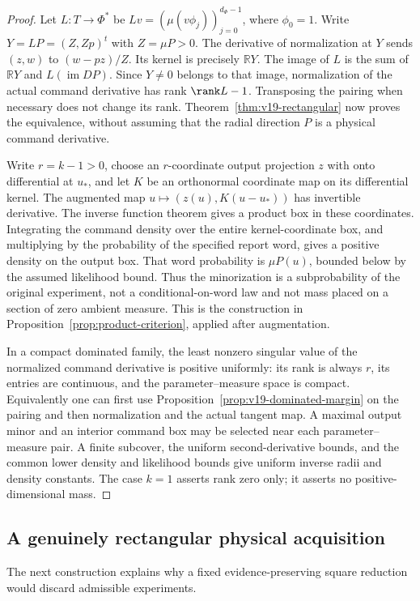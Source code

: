 \documentclass[11pt]{amsart}
\theoremstyle{definition}\newtheorem{definition}[theorem]{Definition}
\theoremstyle{remark}\newtheorem{remark}[theorem]{Remark}
\newcommand{\R}{\mathbb R}\newcommand{\N}{\mathbb N}\newcommand{\C}{\mathbb C}
\begin{document}
\begin{proof}
Let $L:T\to\Phi^*$ be $Lv=(\mu(v\phi_j))_{j=0}^{d_\Phi-1}$,
where $\phi_0=1$. Write $Y=LP=(Z,Zp)^t$ with $Z=\mu P>0$.
The derivative of normalization at $Y$ sends
$(z,w)$ to $(w-pz)/Z$. Its kernel is precisely $\R Y$.
The image of $L$ is the sum of $\R Y$ and $L(\operatorname{im}DP)$.
Since $Y\ne0$ belongs to that image, normalization of the actual
command derivative has rank $\rank L-1$. Transposing the pairing
when necessary does not change its rank. Theorem~\ref{thm:v19-rectangular}
now proves the equivalence, without assuming that the radial direction
$P$ is a physical command derivative.

Write $r=k-1>0$, choose an $r$-coordinate output projection $z$ with
onto differential at $u_*$, and let $K$ be an orthonormal coordinate
map on its differential kernel. The augmented map
$u\mapsto(z(u),K(u-u_*))$ has invertible derivative. The inverse
function theorem gives a product box in these coordinates. Integrating
the command density over the entire kernel-coordinate box, and
multiplying by the probability of the specified report word, gives a
positive density on the output box. That word probability is
$\mu P(u)$, bounded below by the assumed likelihood bound. Thus the
minorization is a subprobability of the original experiment, not a
conditional-on-word law and not mass placed on a section of zero
ambient measure. This is the construction in
Proposition~\ref{prop:product-criterion}, applied after augmentation.

In a compact dominated family, the least nonzero singular value of
the normalized command derivative is positive uniformly: its rank is
always $r$, its entries are continuous, and the parameter--measure
space is compact. Equivalently one can first use
Proposition~\ref{prop:v19-dominated-margin} on the pairing and then
normalization and the actual tangent map. A maximal output minor and
an interior command box may be selected near each parameter--measure
pair. A finite subcover, the uniform second-derivative bounds, and the
common lower density and likelihood bounds give uniform inverse
radii and density constants. The case $k=1$ asserts rank zero only;
it asserts no positive-dimensional mass.
\end{proof}

\subsection{A genuinely rectangular physical acquisition}
The next construction explains why a fixed evidence-preserving square
reduction would discard admissible experiments.
\end{document}
